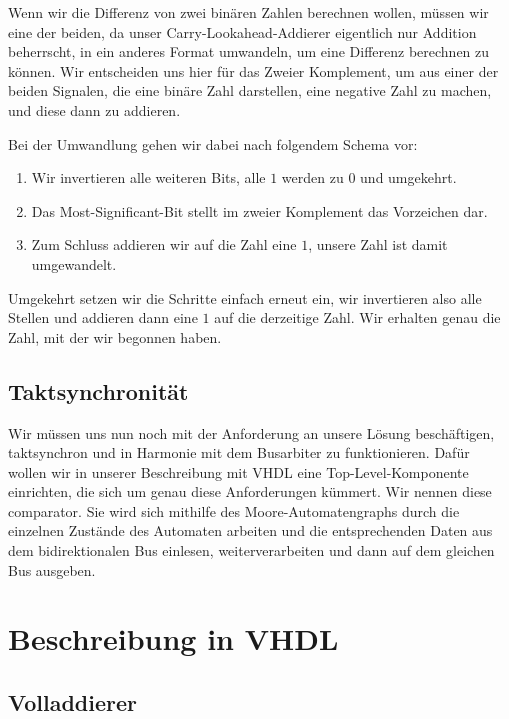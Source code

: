 \documentclass{report}
\begin{document}
Wenn wir die Differenz von zwei binären Zahlen berechnen wollen, müssen wir eine der beiden, da unser Carry-Lookahead-Addierer eigentlich nur Addition beherrscht, in ein anderes Format umwandeln, um eine Differenz berechnen zu können. Wir entscheiden uns hier für das Zweier Komplement, um aus einer der beiden Signalen, die eine binäre Zahl darstellen, eine negative Zahl zu machen, und diese dann zu addieren.

Bei der Umwandlung gehen wir dabei nach folgendem Schema vor:

\begin{enumerate}
  \item Wir invertieren alle weiteren Bits, alle $1$ werden zu $0$ und umgekehrt.
  \item Das Most-Significant-Bit stellt im zweier Komplement das Vorzeichen dar.
  \item Zum Schluss addieren wir auf die Zahl eine $1$, unsere Zahl ist damit umgewandelt.
\end{enumerate}

Umgekehrt setzen wir die Schritte einfach erneut ein, wir invertieren also alle Stellen und addieren dann eine $1$ auf die derzeitige Zahl. Wir erhalten genau die Zahl, mit der wir begonnen haben.

\subsection{Taktsynchronität}
\label{sec:taktsynchronitat}

Wir müssen uns nun noch mit der Anforderung an unsere Lösung beschäftigen, taktsynchron und in Harmonie mit dem Busarbiter zu funktionieren. Dafür wollen wir in unserer Beschreibung mit VHDL eine Top-Level-Komponente einrichten, die sich um genau diese Anforderungen kümmert. Wir nennen diese comparator. Sie wird sich mithilfe des Moore-Automatengraphs durch die einzelnen Zustände des Automaten arbeiten und die entsprechenden Daten aus dem bidirektionalen Bus einlesen, weiterverarbeiten und dann auf dem gleichen Bus ausgeben. 
\newpage

\section{Beschreibung in VHDL}
\label{sec:beschreibung-vhdl-1}

\subsection{Volladdierer}
\end{document}
